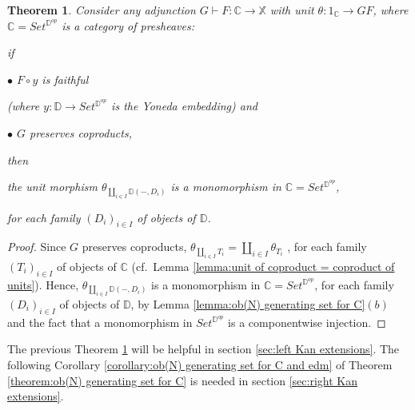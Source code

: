 \documentclass[12pt,a4paper]{amsart}
\newtheorem{theorem}{Theorem}[section]
\theoremstyle{definition}
\begin{document}
\begin{theorem}\label{theorem:coproduct of unit morphisms}\cite[See Remark 6.1]{X:concordant&monotone} Consider any adjunction $G\vdash F:\mathbb{C}\rightarrow \mathbb{X}$ with unit $\theta:1_\mathbb{C}\rightarrow GF$, where $\mathbb{C}=Set^{\mathbb{D}^{op}}$ is a category of presheaves:\vspace{3pt}

\noindent if\vspace{3pt}

$\bullet$ $F\circ y$ is faithful

(where $y:\mathbb{D}\rightarrow Set^{\mathbb{D}^{op}}$ is the Yoneda embedding) and

$\bullet$ $G$ preserves coproducts,\vspace{3pt}

\noindent then\vspace{3pt}

the unit morphism $\theta_{\coprod_{i\in I}\mathbb{D}(-,D_i)}$ is a monomorphism in $\mathbb{C}=Set^{\mathbb{D}^{op}}$,

for each family $(D_i)_{i\in I}$ of objects of $\mathbb{D}$.
\end{theorem}

\begin{proof}
Since $G$ preserves coproducts, $\theta_{\coprod_{i\in I}T_i}=\coprod_{i\in I}\theta_{T_i}$ , for each family $(T_i)_{i\in I}$ of objects of $\mathbb{C}$ (cf.\ Lemma \ref{lemma:unit of coproduct = coproduct of units}). Hence, $\theta_{\coprod_{i\in I}\mathbb{D}(-,D_i)}$ is a monomorphism in $\mathbb{C}=Set^{\mathbb{D}^{op}}$, for each family $(D_i)_{i\in I}$ of objects of $\mathbb{D}$, by Lemma \ref{lemma:ob(N) generating set for C}$(b)$ and the fact that a monomorphism in $Set^{\mathbb{D}^{op}}$ is a componentwise injection.
\end{proof}

The previous Theorem \ref{theorem:coproduct of unit morphisms} will be helpful in section \ref{sec:left Kan extensions}. The following Corollary \ref{corollary:ob(N) generating set for C and edm} of Theorem \ref{theorem:ob(N) generating set for C} is needed in section \ref{sec:right Kan extensions}.
\end{document}
